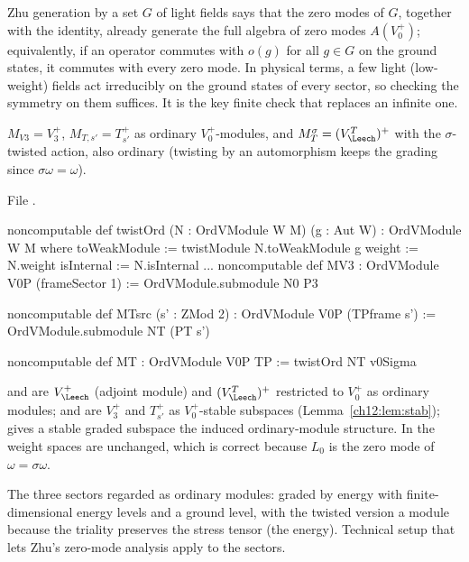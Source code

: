 \begin{physics}
Zhu generation by a set $G$ of light fields says that the zero modes of $G$, together with the identity, already generate the full algebra of zero modes $A(V_0^+)$; equivalently, if an operator commutes with $o(g)$ for all $g\in G$ on the ground states, it commutes with every zero mode. In physical terms, a few light (low-weight) fields act irreducibly on the ground states of every sector, so checking the symmetry on them suffices. It is the key finite check that replaces an infinite one.
\end{physics}

\begin{definition}\label{ch12:def:ordmods}
$M_{V3}=V_3^+$, $M_{T,s'}=T_{s'}^+$ as ordinary $V_0^+$-modules, and $M_T^\sigma=(V_\Leech^T)^+$ with the
$\sigma$-twisted action, also ordinary (twisting by an automorphism keeps the grading since
$\sigma\omega=\omega$).
\end{definition}
File .
\begin{leancode}
noncomputable def twistOrd (N : OrdVModule W M) (g : Aut W) : OrdVModule W M where
  toWeakModule := twistModule N.toWeakModule g
  weight := N.weight  isInternal := N.isInternal
  ...
noncomputable def MV3 : OrdVModule V0P (frameSector 1) := OrdVModule.submodule N0 P3

noncomputable def MTsrc (s' : ZMod 2) : OrdVModule V0P (TPframe s') := OrdVModule.submodule NT (PT s')

noncomputable def MT : OrdVModule V0P TP := twistOrd NT v0Sigma
\end{leancode}
\begin{dictionary}
 and  are $V_\Leech^+$ (adjoint module) and $(V_\Leech^T)^+$ restricted to $V_0^+$ as
ordinary modules;  and  are $V_3^+$ and $T_{s'}^+$ as $V_0^+$-stable subspaces
(Lemma~\ref{ch12:lem:stab});  gives a stable graded subspace the induced
ordinary-module structure.  In  the weight spaces are unchanged, which is correct because
$L_0$ is the zero mode of $\omega=\sigma\omega$.
\end{dictionary}

\begin{physics}
The three sectors regarded as ordinary modules: graded by energy with finite-dimensional energy levels and a ground level, with the twisted version a module because the triality preserves the stress tensor (the energy). Technical setup that lets Zhu's zero-mode analysis apply to the sectors.
\end{physics}

